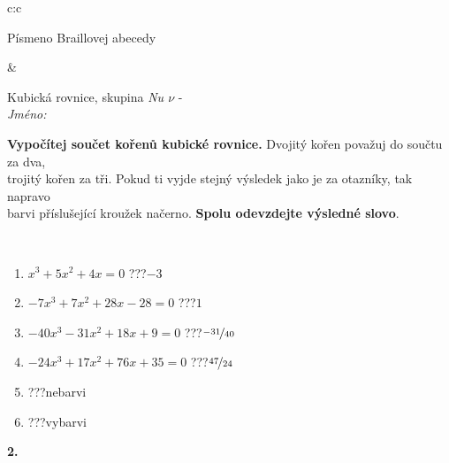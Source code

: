\documentclass[10pt]{report}
\begin{document}
\begin{tabular}{c:c}
\begin{minipage}[c][104.5mm][t]{0.5\linewidth}
\begin{center}
\begin{minipage}{0.20\linewidth}
\begin{center}
{\small Písmeno Braillovej abecedy}
\end{center}
\end{minipage}
\end{center}
\end{minipage}
&
\begin{minipage}[c][104.5mm][t]{0.5\linewidth}
\begin{center}
\vspace{7mm}
{\huge Kubická rovnice, skupina \textit{Nu $\nu$} -}\\[5mm]
\textit{Jméno:}\phantom{xxxxxxxxxxxxxxxxxxxxxxxxxxxxxxxxxxxxxxxxxxxxxxxxxxxxxxxxxxxxxxxxx}\\[5mm]
\begin{minipage}{0.95\linewidth}
\begin{center}
\textbf{Vypočítej součet kořenů kubické rovnice.} Dvojitý kořen považuj do součtu za dva,\\trojitý kořen za tři. Pokud ti vyjde stejný výsledek jako je za otazníky, tak napravo\\barvi příslušející kroužek načerno. \textbf{Spolu odevzdejte výsledné slovo}.
\end{center}
\end{minipage}
\\[1mm]
\begin{minipage}{0.79\linewidth}
\begin{center}
\begin{varwidth}{\linewidth}
\begin{enumerate}
\Large
\item $x^3+5x^2+4x=0$\quad \dotfill\; ???\;\dotfill \quad $-3$
\item $-7x^3+7x^2+28x-28=0$\quad \dotfill\; ???\;\dotfill \quad $1$
\item $-40x^3-31x^2+18x+9=0$\quad \dotfill\; ???\;\dotfill \quad $\nicefrac{-31}{40}$
\item $-24x^3+17x^2+76x+35=0$\quad \dotfill\; ???\;\dotfill \quad $\nicefrac{47}{24}$
\item \quad \dotfill\; ???\;\dotfill \quad nebarvi
\item \quad \dotfill\; ???\;\dotfill \quad vybarvi
\end{enumerate}
\end{varwidth}
\end{center}
\end{minipage}
\begin{minipage}{0.20\linewidth}
\begin{center}
{\Huge\bfseries 2.} \\[2mm]

\end{center}
\end{minipage}
\end{center}
\end{minipage}
\end{tabular}
\end{document}
